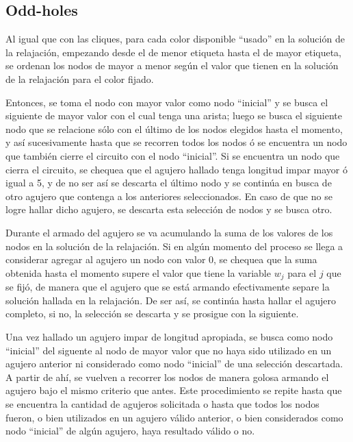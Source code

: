 \documentclass[a4paper]{article}
\begin{document}
\subsection{Odd-holes}

Al igual que con las cliques, para cada color disponible ``usado'' en la solución de la relajación, empezando desde el de menor etiqueta hasta el de mayor etiqueta, se ordenan los nodos de mayor a menor según el valor que tienen en la solución de la relajación para el color fijado.  

Entonces, se toma el nodo con mayor valor como nodo ``inicial'' y se busca el siguiente de mayor valor con el cual tenga una arista; luego se busca el siguiente nodo que se relacione sólo con el último de los nodos elegidos hasta el momento, y así sucesivamente hasta que se recorren todos los nodos ó se encuentra un nodo que también cierre el circuito con el nodo ``inicial''.  Si se encuentra un nodo que cierra el circuito, se chequea que el agujero hallado tenga longitud impar mayor ó igual a 5, y de no ser así se descarta el último nodo y se continúa en busca de otro agujero que contenga a los anteriores seleccionados. En caso de que no se logre hallar dicho agujero, se descarta esta selección de nodos y se busca otro.

Durante el armado del agujero se va acumulando la suma de los valores de los nodos en la solución de la relajación.  Si en algún momento del proceso se llega a considerar agregar al agujero un nodo con valor 0,  se chequea que la suma obtenida hasta el momento supere el valor que tiene la variable $w_j$ para el $j$ que se fijó, de manera que el agujero que se está armando efectivamente separe la solución hallada en la relajación.  De ser así, se continúa hasta hallar el agujero completo, si no, la selección se descarta y se prosigue con la siguiente.

Una vez hallado un agujero impar de longitud apropiada, se busca como nodo ``inicial'' del siguente al nodo de mayor valor que no haya sido utilizado en un agujero anterior ni considerado como nodo ``inicial'' de una selección descartada.  A partir de ahí, se vuelven a recorrer los nodos de manera golosa armando el agujero bajo el mismo criterio que antes. Este procedimiento se repite hasta que se encuentra la cantidad de agujeros solicitada o hasta que todos los nodos fueron, o bien utilizados en un agujero válido anterior, o bien considerados como nodo ``inicial'' de algún agujero, haya resultado válido o no. 
\end{document}

